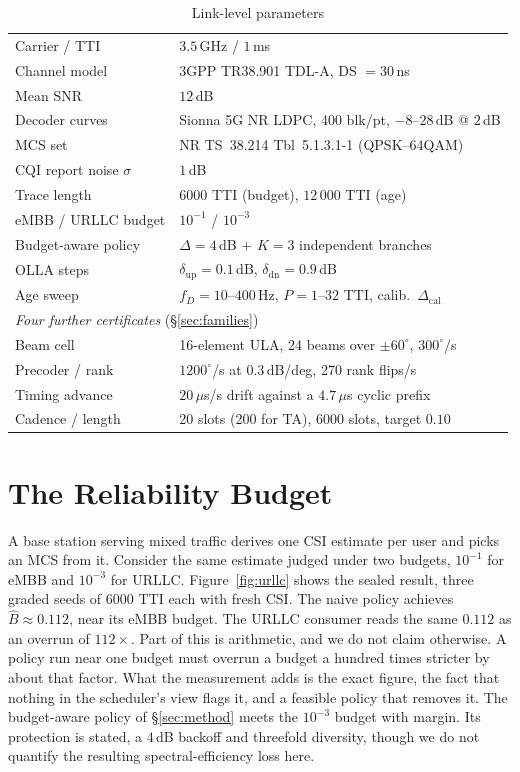 \documentclass[conference]{IEEEtran}
\begin{document}
\begin{table}[t]
\caption{Link-level parameters}
\label{tab:params}
\centering
\scriptsize
\setlength{\tabcolsep}{3pt}
\begin{tabular}{ll}
\hline
Carrier / TTI & $3.5$\,GHz / $1$\,ms \\
Channel model & 3GPP TR38.901 TDL-A, DS $=30$\,ns \\
Mean SNR & $12$\,dB \\
Decoder curves & Sionna 5G NR LDPC, 400 blk/pt, $-8$--$28$\,dB @ $2$\,dB \\
MCS set & NR TS~38.214 Tbl~5.1.3.1-1 (QPSK--64QAM) \\
CQI report noise $\sigma$ & $1$\,dB \\
Trace length & $6000$ TTI (budget), $12\,000$ TTI (age) \\
eMBB / URLLC budget & $10^{-1}$ / $10^{-3}$ \\
Budget-aware policy & $\Delta=4$\,dB $+$ $K{=}3$ independent branches \\
OLLA steps & $\delta_{\mathrm{up}}=0.1$\,dB, $\delta_{\mathrm{dn}}=0.9$\,dB \\
Age sweep & $f_D=10$--$400$\,Hz, $P=1$--$32$ TTI, calib.\ $\Delta_{\mathrm{cal}}$ \\
\hline
\multicolumn{2}{l}{\emph{Four further certificates} (\S\ref{sec:families})} \\
\hline
Beam cell & 16-element ULA, 24 beams over $\pm 60^\circ$, $300^\circ$/s \\
Precoder / rank & $1200^\circ$/s at $0.3$\,dB/deg, 270 rank flips/s \\
Timing advance & $20\,\mu$s/s drift against a $4.7\,\mu$s cyclic prefix \\
Cadence / length & 20 slots (200 for TA), 6000 slots, target $0.10$ \\
\hline
\end{tabular}
\end{table}

\section{The Reliability Budget}
\label{sec:budget}
A base station serving mixed traffic derives one CSI estimate per user and picks
an MCS from it. Consider the same estimate judged under two budgets, $10^{-1}$
for eMBB and $10^{-3}$ for URLLC. Figure~\ref{fig:urllc} shows the sealed result,
three graded seeds of $6000$ TTI each with fresh CSI. The naive policy achieves
$\widehat{B}\approx 0.112$, near its eMBB budget. The URLLC consumer reads the
same $0.112$ as an overrun of $112\times$. Part of this is arithmetic, and we do
not claim otherwise. A policy run near one budget must overrun a budget a
hundred times stricter by about that factor. What the measurement adds is the
exact figure, the fact that nothing in the scheduler's view flags it, and a
feasible policy that removes it. The budget-aware policy of \S\ref{sec:method}
meets the $10^{-3}$ budget with margin. Its protection is stated, a $4$\,dB
backoff and threefold diversity, though we do not quantify the resulting
spectral-efficiency loss here.
\end{document}
